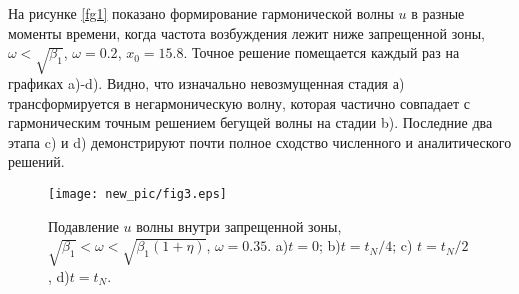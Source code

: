 На рисунке \ref{fg1} показано формирование гармонической волны $ u $ в разные моменты времени, когда частота возбуждения лежит ниже запрещенной зоны, $ \omega <\sqrt {\beta_1} $, $ \omega = 0.2 $, $ x_0 = 15.8 $. Точное решение помещается каждый раз на графиках a)-d). Видно, что изначально невозмущенная стадия а) трансформируется в негармоническую волну, которая частично совпадает с гармоническим точным решением бегущей волны на стадии b). Последние два этапа c) и d) демонстрируют почти полное сходство численного и аналитического решений.
\begin{figure*}
\begin{center}
\texttt{[image: new\_pic/fig3.eps]}
\end{center}
\caption{Подавление $ u $ волны внутри запрещенной зоны, $\sqrt{\beta_1}<\omega<\sqrt{\beta_1(1+\eta)}$, $\omega=0.35$. a)$t=0$; b)$ t=t_N/4$; c) $t=t_N/2$, d)$t=t_N$.}
\label{fg3}
\end{figure*}
  

